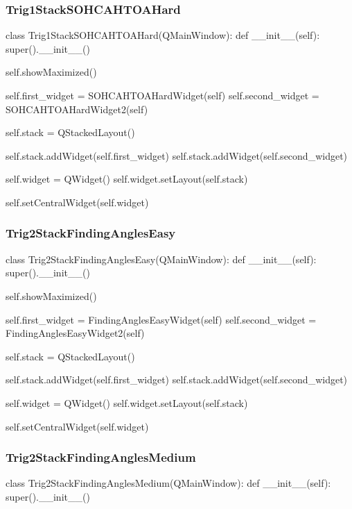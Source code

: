 \begin{landscape}
\subsubsection{Trig1StackSOHCAHTOAHard}

\begin{python}
class Trig1StackSOHCAHTOAHard(QMainWindow):
    def __init__(self):
        super().__init__()

        self.showMaximized()

        self.first_widget = SOHCAHTOAHardWidget(self)
        self.second_widget = SOHCAHTOAHardWidget2(self)

        self.stack = QStackedLayout()

        self.stack.addWidget(self.first_widget)
        self.stack.addWidget(self.second_widget)

        self.widget = QWidget()
        self.widget.setLayout(self.stack)

        self.setCentralWidget(self.widget)
\end{python}

\subsubsection{Trig2StackFindingAnglesEasy}

\begin{python}
class Trig2StackFindingAnglesEasy(QMainWindow):
    def __init__(self):
        super().__init__()

        self.showMaximized()

        self.first_widget = FindingAnglesEasyWidget(self)
        self.second_widget = FindingAnglesEasyWidget2(self)

        self.stack = QStackedLayout()

        self.stack.addWidget(self.first_widget)
        self.stack.addWidget(self.second_widget)

        self.widget = QWidget()
        self.widget.setLayout(self.stack)

        self.setCentralWidget(self.widget)
\end{python}

\subsubsection{Trig2StackFindingAnglesMedium}

\begin{python}
class Trig2StackFindingAnglesMedium(QMainWindow):
    def __init__(self):
        super().__init__()


\end{python}
\end{landscape}
